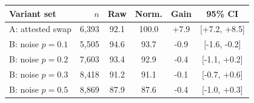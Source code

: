 \begin{tabular}{lrcccc}
\toprule
Variant set & $n$ & Raw & Norm. & Gain & 95\% CI\\
\midrule
A: attested swap & 6,393 & 92.1 & 100.0 & +7.9 & [+7.2, +8.5]\\
B: noise $p{=}0.1$ & 5,505 & 94.6 & 93.7 & -0.9 & [-1.6, -0.2]\\
B: noise $p{=}0.2$ & 7,603 & 93.4 & 92.9 & -0.4 & [-1.1, +0.2]\\
B: noise $p{=}0.3$ & 8,418 & 91.2 & 91.1 & -0.1 & [-0.7, +0.6]\\
B: noise $p{=}0.5$ & 8,869 & 87.9 & 87.6 & -0.4 & [-1.0, +0.3]\\
\bottomrule
\end{tabular}
